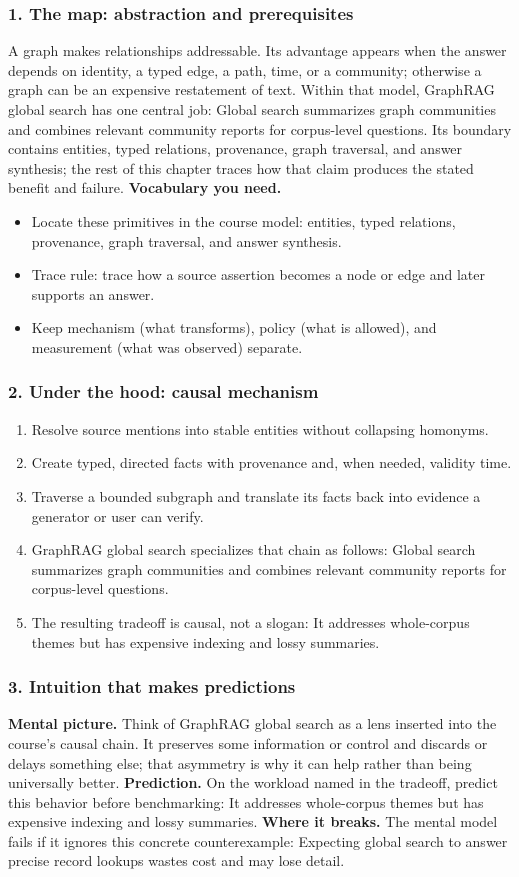 \subsubsection*{1. The map: abstraction and prerequisites}
A graph makes relationships addressable. Its advantage appears when the answer depends on identity, a typed edge, a path, time, or a community; otherwise a graph can be an expensive restatement of text.
Within that model, GraphRAG global search has one central job: Global search summarizes graph communities and combines relevant community reports for corpus-level questions. Its boundary contains entities, typed relations, provenance, graph traversal, and answer synthesis; the rest of this chapter traces how that claim produces the stated benefit and failure.
\textbf{Vocabulary you need.}\begin{itemize}
\item Locate these primitives in the course model: entities, typed relations, provenance, graph traversal, and answer synthesis.
\item Trace rule: trace how a source assertion becomes a node or edge and later supports an answer.
\item Keep mechanism (what transforms), policy (what is allowed), and measurement (what was observed) separate.
\end{itemize}
\subsubsection*{2. Under the hood: causal mechanism}\begin{enumerate}
\item Resolve source mentions into stable entities without collapsing homonyms.
\item Create typed, directed facts with provenance and, when needed, validity time.
\item Traverse a bounded subgraph and translate its facts back into evidence a generator or user can verify.
\item GraphRAG global search specializes that chain as follows: Global search summarizes graph communities and combines relevant community reports for corpus-level questions.
\item The resulting tradeoff is causal, not a slogan: It addresses whole-corpus themes but has expensive indexing and lossy summaries.
\end{enumerate}
\subsubsection*{3. Intuition that makes predictions}
\textbf{Mental picture.} Think of GraphRAG global search as a lens inserted into the course's causal chain. It preserves some information or control and discards or delays something else; that asymmetry is why it can help rather than being universally better.
\textbf{Prediction.} On the workload named in the tradeoff, predict this behavior before benchmarking: It addresses whole-corpus themes but has expensive indexing and lossy summaries.
\textbf{Where it breaks.} The mental model fails if it ignores this concrete counterexample: Expecting global search to answer precise record lookups wastes cost and may lose detail.
